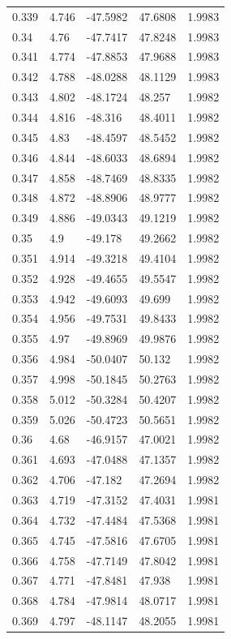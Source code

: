 \begin{tabular}{lllll}
0.339 & 4.746 & -47.5982 & 47.6808 & 1.9983 \\
0.34 & 4.76 & -47.7417 & 47.8248 & 1.9983 \\
0.341 & 4.774 & -47.8853 & 47.9688 & 1.9983 \\
0.342 & 4.788 & -48.0288 & 48.1129 & 1.9983 \\
0.343 & 4.802 & -48.1724 & 48.257 & 1.9982 \\
0.344 & 4.816 & -48.316 & 48.4011 & 1.9982 \\
0.345 & 4.83 & -48.4597 & 48.5452 & 1.9982 \\
0.346 & 4.844 & -48.6033 & 48.6894 & 1.9982 \\
0.347 & 4.858 & -48.7469 & 48.8335 & 1.9982 \\
0.348 & 4.872 & -48.8906 & 48.9777 & 1.9982 \\
0.349 & 4.886 & -49.0343 & 49.1219 & 1.9982 \\
0.35 & 4.9 & -49.178 & 49.2662 & 1.9982 \\
0.351 & 4.914 & -49.3218 & 49.4104 & 1.9982 \\
0.352 & 4.928 & -49.4655 & 49.5547 & 1.9982 \\
0.353 & 4.942 & -49.6093 & 49.699 & 1.9982 \\
0.354 & 4.956 & -49.7531 & 49.8433 & 1.9982 \\
0.355 & 4.97 & -49.8969 & 49.9876 & 1.9982 \\
0.356 & 4.984 & -50.0407 & 50.132 & 1.9982 \\
0.357 & 4.998 & -50.1845 & 50.2763 & 1.9982 \\
0.358 & 5.012 & -50.3284 & 50.4207 & 1.9982 \\
0.359 & 5.026 & -50.4723 & 50.5651 & 1.9982 \\
0.36 & 4.68 & -46.9157 & 47.0021 & 1.9982 \\
0.361 & 4.693 & -47.0488 & 47.1357 & 1.9982 \\
0.362 & 4.706 & -47.182 & 47.2694 & 1.9982 \\
0.363 & 4.719 & -47.3152 & 47.4031 & 1.9981 \\
0.364 & 4.732 & -47.4484 & 47.5368 & 1.9981 \\
0.365 & 4.745 & -47.5816 & 47.6705 & 1.9981 \\
0.366 & 4.758 & -47.7149 & 47.8042 & 1.9981 \\
0.367 & 4.771 & -47.8481 & 47.938 & 1.9981 \\
0.368 & 4.784 & -47.9814 & 48.0717 & 1.9981 \\
0.369 & 4.797 & -48.1147 & 48.2055 & 1.9981 \\

\end{tabular}
